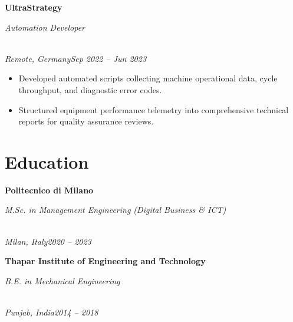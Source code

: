 \documentclass[a4paper,10pt]{article}
\newcommand{\role}[4]{\vspace{3pt}\noindent\hspace{0.6em}\parbox[t]{0.38\textwidth}{\raggedright\textbf{#1}}\hfill\parbox[t]{0.58\textwidth}{\raggedleft\textit{#2}}\\{\textit{#3}\hfill\textit{#4}}\vspace{1pt}}
\begin{document}
\role{UltraStrategy}{Automation Developer}{Remote, Germany}{Sep 2022 -- Jun 2023}
\begin{itemize}
\item Developed automated scripts collecting machine operational data, cycle throughput, and diagnostic error codes.
\item Structured equipment performance telemetry into comprehensive technical reports for quality assurance reviews.
\end{itemize}

\section{Education}
\role{Politecnico di Milano}{M.Sc. in Management Engineering (Digital Business \& ICT)}{Milan, Italy}{2020 -- 2023}
\role{Thapar Institute of Engineering and Technology}{B.E. in Mechanical Engineering}{Punjab, India}{2014 -- 2018}
\end{document}
